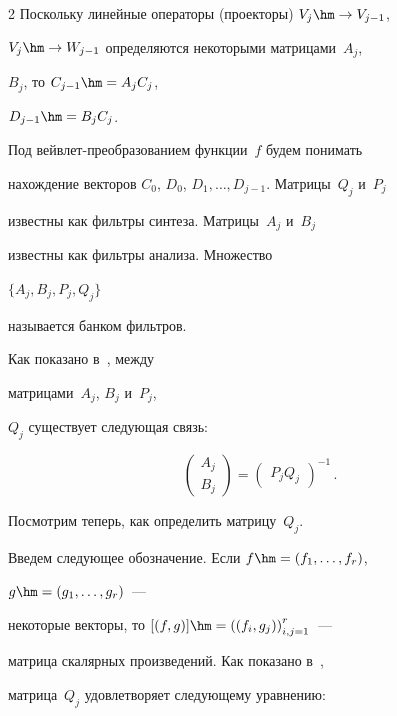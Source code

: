 \begin{multicols}{2}
Поскольку линейные операторы (проекторы) $V_{j} \hm\to V_{j-1}$,


$V_{j} \hm\to W_{j-1} $ определяются некоторыми матрицами~${A}_{j}$,


${B}_{j}$, то ${C}_{j-1} \hm={A}_{j} {C}_{j}$,


${D}_{j-1} \hm={B}_{j} {C}_{j}$.





Под вейвлет-преобра\-зо\-ва\-ни\-ем функции~$f$ будем понимать 


нахождение векторов ${C}_{0}$, ${D}_{0}$, ${D}_{1} ,


\dots, D_{j-1}$. Матрицы~${Q}_j$ и~${P}_j$ 


известны как фильт\-ры синтеза. Матрицы~${A}_j$ и~${B}_j$ 


известны как фильт\-ры анализа. Множество 


$\{{A}_j, {B}_j, {P}_j,{Q}_j\}$ 


называется банком фильтров.





Как показано в~\cite{ArticleFinkelstein}, между 


матрицами~${A}_{j}$, ${B}_{j}$ и~${P}_{j}$, 


${Q}_{j} $ существует следующая связь:


$$


\begin{pmatrix} {A}_{j} \\ {B}_{j} \end{pmatrix}=


\begin{pmatrix} {P}_{j} {Q}_{j}\end{pmatrix}^{-1}\,.


$$





Посмотрим теперь, как определить мат\-ри\-цу~${Q}_{j}$. 


Введем следующее обозначение. Если ${f}\hm=\left(f_{1} ,\dots, f_{r} \right)$,


${g}\hm=\left(g_{1} ,\dots,g_{r} \right)$~--- 


некоторые векторы, то $[({f},{g})]\hm=


\left(\left(f_{i} ,g_{j} \right)\right)_{i,j=1}^{r} $~--- 


мат\-ри\-ца скалярных произведений.  Как показано в~\cite{ArticleFinkelstein}, 


мат\-ри\-ца~${Q}_{j} $ удовлетворяет следующему уравнению: 



\end{multicols}
